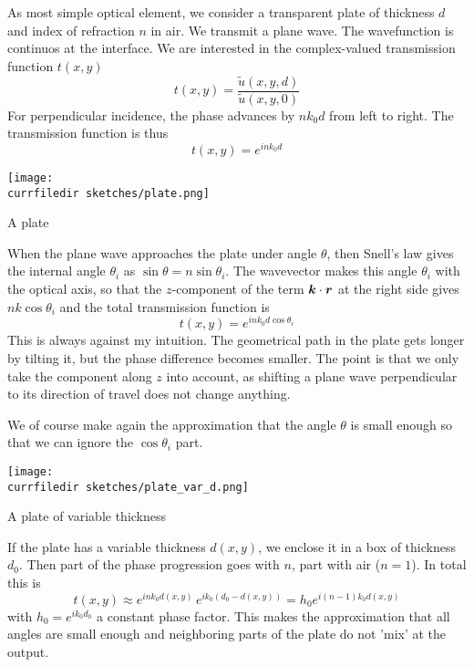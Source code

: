 As most simple optical element, we consider a transparent plate of thickness $d$ and index of refraction $n$ in air. We transmit a plane wave. The wavefunction is continuos at the interface. We are interested in the complex-valued transmission function $t(x,y)$
\begin{equation}
    t(x,y) = \frac{\tilde{u}(x,y,d)}{\tilde{u}(x,y,0)}
\end{equation}
For perpendicular incidence, the phase advances by $n k_0 d$ from left to right. The transmission function is thus
\begin{equation}
    t(x,y)  = e^{i n k_0 d}
\end{equation}

\begin{marginfigure}
    \texttt{[image: \\currfiledir sketches/plate.png]}
   \caption{A plate}
\end{marginfigure}


When the plane wave approaches the plate under angle $\theta$, then Snell's law gives the internal angle $\theta_i$ as $\sin \theta = n \sin \theta_i$. The wavevector makes this angle $\theta_i$ with the optical axis, so that the $z$-component of the term $\boldsymbol{k} \cdot \boldsymbol{r}$ at the right side gives $n k \cos \theta_i$ and the total transmission function is
\begin{equation}
    t(x,y)  = e^{i n k_0 d \cos \theta_i}
\end{equation}
This is always against my intuition. The geometrical path in the plate gets longer by tilting it, but the phase difference becomes smaller. The point is that we only take the component along $z$ into account, as shifting a plane wave perpendicular to its direction of travel does not change anything.

We of course make again the approximation that the angle $\theta$ is small enough so that we can ignore the $\cos \theta_i$ part.

\begin{marginfigure}
    \texttt{[image: \\currfiledir sketches/plate\_var\_d.png]}
   \caption{A plate of variable thickness}
\end{marginfigure}


If the plate has a variable thickness $d(x,y)$, we enclose it in a box of thickness $d_0$. Then part of the phase progression goes with $n$, part with air ($n=1$). In total this is
\begin{equation}
    t(x,y) \approx e^{i n k_0 d(x,y)} \,  e^{i k_0 (d_0 - d(x,y))}
    = h_0   e^{i (n-1) k_0 d(x,y)}
\end{equation}
with $h_0 = e^{i  k_0 d_0}$ a constant phase factor. This makes the approximation that all angles are small enough and neighboring parts of the plate do not 'mix' at the output.


